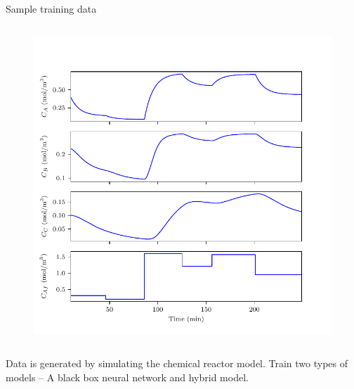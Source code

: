 \documentclass[xcolor=dvipsnames, 8pt]{beamer} %
\begin{document}
\begin{frame}{Sample training data}

	\begin{columns}

		\vspace{-0.1in}
		\begin{figure}
		  \includegraphics[page=1, height=0.8\textheight]{tworeac_plots.pdf}
		\end{figure}
	\end{columns}
	Data is generated by simulating the chemical reactor model. Train two types
	of models -- \alert{A black box neural network and hybrid model.}
\end{frame}
\end{document}
